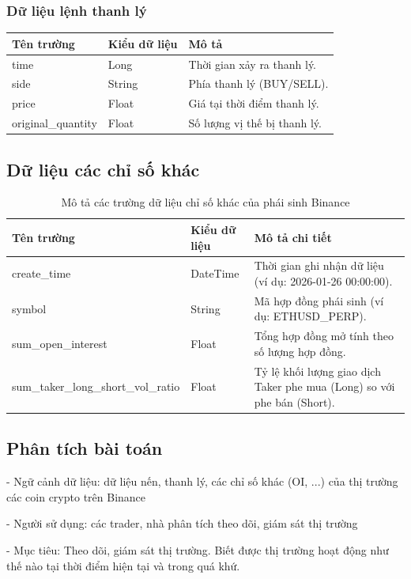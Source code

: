 \subsubsection{Dữ liệu lệnh thanh lý \cite{binance_liquidation}}
\begin{table}[H]
\centering
\begin{tabular}{|l|l|l|}
\hline
\textbf{Tên trường} & \textbf{Kiểu dữ liệu} & \textbf{Mô tả} \\ \hline
time & Long & Thời gian xảy ra thanh lý. \\ \hline
side & String & Phía thanh lý (BUY/SELL). \\ \hline
price & Float & Giá tại thời điểm thanh lý. \\ \hline
original\_quantity & Float & Số lượng vị thế bị thanh lý. \\ \hline
\end{tabular}
\end{table}


\subsection{Dữ liệu các chỉ số khác \cite{binance_metrics}}

\begin{table}[H]
\renewcommand{\arraystretch}{1.25}
\centering
\begin{tabular}{|l|l|p{8cm}|}
\hline
\textbf{Tên trường} & \textbf{Kiểu dữ liệu} & \textbf{Mô tả chi tiết} \\ \hline
create\_time & DateTime & Thời gian ghi nhận dữ liệu (ví dụ: 2026-01-26 00:00:00). \\ \hline
symbol & String & Mã hợp đồng phái sinh (ví dụ: ETHUSD\_PERP). \\ \hline
sum\_open\_interest & Float & Tổng hợp đồng mở tính theo số lượng hợp đồng. \\ \hline
sum\_taker\_long\_short\_vol\_ratio & Float & Tỷ lệ khối lượng giao dịch Taker phe mua (Long) so với phe bán (Short). \\ \hline
\end{tabular}
\caption{Mô tả các trường dữ liệu chỉ số khác của phái sinh Binance}
\end{table}


\subsection{Phân tích bài toán}
- Ngữ cảnh dữ liệu: dữ liệu nến, thanh lý, các chỉ số khác (OI, ...) của thị trường các coin crypto trên Binance

- Người sử dụng: các trader, nhà phân tích theo dõi, giám sát thị trường

- Mục tiêu: Theo dõi, giám sát thị trường. Biết được thị trường hoạt động như thế nào tại thời điểm hiện tại và trong quá khứ.
